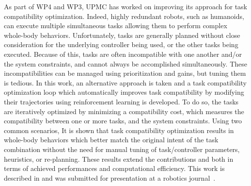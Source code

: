 As part of WP4 and WP3, UPMC has worked on improving its approach for task compatibility optimization. Indeed, highly redundant robots, such as humanoids, can execute multiple simultaneous tasks allowing them to perform complex whole-body behaviors. Unfortunately, tasks are generally planned without close consideration for the underlying controller being used, or the other tasks being executed. Because of this, tasks are often incompatible with one another and/or the system constraints, and cannot always be accomplished simultaneously. These incompatibilities can be managed using prioritization and gains, but tuning them is tedious. In this work, an alternative approach is taken and a task compatibility optimization loop which automatically improves task compatibility by modifying their trajectories using reinforcement learning is developed. To do so, the tasks are iteratively optimized by minimizing a compatibility cost, which measures the compatibility between one or more tasks, and the system constraints. Using two common scenarios, It is shown that task compatibility optimization results in whole-body behaviors which better match the original intent of the task combination without the need for manual tuning of task/controller parameters, heuristics, or re-planning. These results extend the contributions \cite{lober-HUMANOIDS2014} and \cite{lober_IROS2015} both in terms of achieved performances and computational efficiency. This work is described in \cite{deliverable33} and was submitted for presentation at a robotics journal~\cite{lober2017RAL-IROS}.

